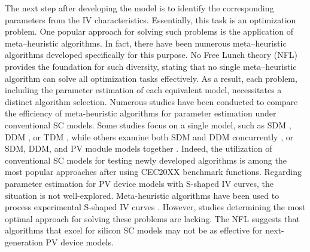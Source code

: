 \documentclass[a4paper,fleqn]{cas-dc}
\begin{document}
The next step after developing the model is to identify the corresponding parameters from the IV characteristics.
Essentially, this task is an optimization problem.
One popular approach for solving such problems is the application of meta--heuristic algorithms.
In fact, there have been numerous meta--heuristic algorithms developed specifically for this purpose.
No Free Lunch theory (NFL) \cite{NFL} provides the foundation for such diversity,
stating that no single meta--heuristic algorithm can solve all optimization tasks effectively.
As a result, each problem, including the parameter estimation of each equivalent model, necessitates a distinct algorithm selection.
Numerous studies have been conducted to compare the efficiency of meta-heuristic algorithms for parameter estimation under conventional SC models.
Some studies focus on a single model, such as SDM \cite{DE_EM}, DDM \cite{SSA,FWA}, or TDM \cite{ELSHADE_INR},
while others examine both SDM and DDM concurrently
\cite{ELPSO,Barth2016,BPFPA,MPALW},
or SDM, DDM, and PV module models together
\cite{IMPA,SCA_NM_OBL,HFAPS,IWOA}.
Indeed, the utilization of conventional SC models for testing newly developed
algorithms is among the most popular approaches after using CEC20XX benchmark functions.
Regarding parameter estimation for PV device models with S-shaped IV curves, 
the situation is not well-explored. 
Meta-heuristic algorithms have been used to process experimental S-shaped IV curves \cite{Pillai2017}. 
However, studies determining the most optimal approach for solving these problems are lacking. 
The NFL suggests that algorithms that excel for silicon SC models
 may not be as effective for next-generation PV device models.
\end{document}

